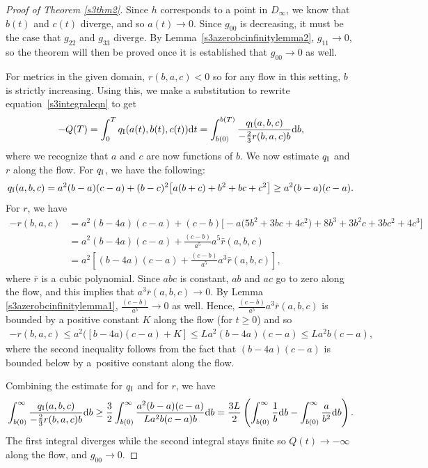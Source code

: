 \documentclass[pdftex]{sigma}
\numberwithin{equation}{section}
\begin{document}
\begin{proof}[Proof of Theorem \ref{s3thm2}]
Since $h$ corresponds to a point in $D_{\infty}$, we know that $b(t)$ and $c(t)$ diverge, and so $a(t) \rightarrow 0$. Since $g_{00}$ is decreasing, it must be the case that $g_{22}$ and $g_{33}$ diverge. By Lemma~\ref{s3azerobcinfinitylemma2}, $g_{11} \rightarrow 0$, so the theorem will then be proved once it is established that $g_{00} \rightarrow 0$ as well.

For metrics in the given domain, $r(b, a, c) < 0$ so for any flow in this setting, $b$ is strictly increasing. Using this, we make a substitution to rewrite equation~\eqref{s3integraleqn} to get
\[
-Q(T) = \int_0^T q_{\rm I}(a(t), b(t), c(t)) {\rm d}t = \int_{b(0)}^{b(T)} \frac{q_{\rm I}(a, b, c)}{-\frac{2}{3} r(b, a, c) b} {\rm d} b,
\]
where we recognize that $a$ and $c$ are now functions of $b$. We now estimate $q_{\rm I}$ and $r$ along the flow. For $q_{\rm I}$, we have the following:
\begin{gather*}
q_{\rm I}(a, b, c) = a^2(b - a)(c - a) + (b - c)^2\big[a(b + c) + b^2 + bc + c^2\big]
		 \geq a^2(b - a)(c - a).
\end{gather*}
For $r$, we have
\begin{align*}
-r(b, a, c) &= a^2(b - 4a)(c - a)
		+ (c - b)\big[{-}a\big(5b^2 + 3bc + 4c^2\big) + 8b^3 + 3b^2 c + 3b c^2 + 4c^3\big] \\
		&= a^2(b - 4a)(c - a) + \frac{(c - b)}{a^5} a^5 \bar{r}(a, b, c) \\
		&= a^2\left[(b - 4a)(c - a) + \frac{(c - b)}{a^5} a^3 \bar{r}(a, b, c)\right],
\end{align*}
where $\bar{r}$ is a cubic polynomial. Since $abc$ is constant, $ab$ and $ac$ go to zero along the flow, and this implies that $a^3 \bar{r}(a, b, c) \rightarrow 0$. By Lemma \ref{s3azerobcinfinitylemma1}, $\frac{(c - b)}{a^5} \rightarrow 0$ as well. Hence, $\frac{(c - b)}{a^5} a^3 \bar{r}(a, b, c)$ is bounded by a positive constant $K$ along the flow (for $t \geq 0$) and so
\begin{gather*}
-r(b, a, c) \leq a^2([b - 4a)(c - a) + K]
		\leq L a^2(b - 4a)(c - a)
		\leq L a^2 b (c - a),
\end{gather*}
where the second inequality follows from the fact that $(b - 4a)(c - a)$ is bounded below by a~positive constant along the flow.

Combining the estimate for $q_{\rm I}$ and for $r$, we have
\begin{gather*}
\int_{b(0)}^{\infty} \frac{q_{\rm I}(a, b, c)}{-\frac{2}{3} r(b, a, c) b} {\rm d} b
		 \geq \frac{3}{2} \int_{b(0)}^{\infty} \frac{a^2(b - a)(c - a)}{L a^2 b (c - a) b} {\rm d} b
		 = \frac{3L}{2} \left( \int_{b(0)}^{\infty} \frac{1}{b} {\rm d} b - \int_{b(0)}^{\infty} \frac{a}{b^2} {\rm d} b \right).
\end{gather*}
The first integral diverges while the second integral stays finite so $Q(t) \rightarrow -\infty$ along the flow, and $g_{00} \rightarrow 0$.
\end{proof}
\end{document}
